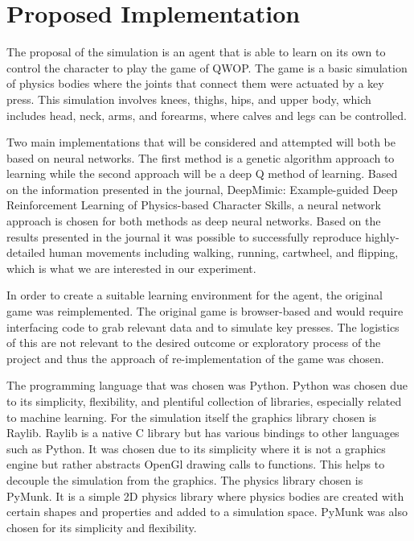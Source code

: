 \documentclass[letterpaper]{article} %
\begin{document}
\section{Proposed Implementation}

The proposal of the simulation is an agent that is able to learn on its own to control the character to play the game of QWOP. The game is a basic simulation of physics bodies where the joints that connect them were actuated by a key press. This simulation involves knees, thighs, hips, and upper body, which includes head, neck, arms, and forearms, where calves and legs can be controlled.

\par Two main implementations that will be considered and attempted will both be based on neural networks. The first method is a genetic algorithm approach to learning while the second approach will be a deep Q method of learning. Based on the information presented in the journal, DeepMimic: Example-guided Deep Reinforcement Learning of Physics-based Character Skills, a neural network approach is chosen for both methods as deep neural networks. Based on the results presented in the journal it was possible to successfully reproduce highly-detailed human movements including walking, running, cartwheel, and flipping, which is what we are interested in our experiment.

\par In order to create a suitable learning environment for the agent, the original game was reimplemented. The original game is browser-based and would require interfacing code to grab relevant data and to simulate key presses. The logistics of this are not relevant to the desired outcome or exploratory process of the project and thus the approach of re-implementation of the game was chosen.

\par The programming language that was chosen was Python. Python was chosen due to its simplicity, flexibility, and plentiful collection of libraries, especially related to machine learning. For the simulation itself the graphics library chosen is Raylib. Raylib is a native C library but has various bindings to other languages such as Python. It was chosen due to its simplicity where it is not a graphics engine but rather abstracts OpenGl drawing calls to functions. This helps to decouple the simulation from the graphics. The physics library chosen is PyMunk. It is a simple 2D physics library where physics bodies are created with certain shapes and properties and added to a simulation space. PyMunk was also chosen for its simplicity and flexibility.
\end{document}
